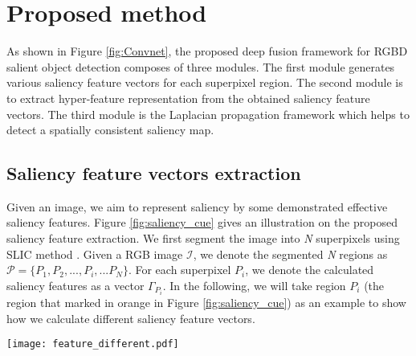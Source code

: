 \documentclass[journal]{IEEEtran}
\begin{document}
\section{Proposed method}
As shown in Figure \ref{fig:Convnet}, the proposed deep fusion framework for RGBD salient object detection composes of three modules. The first module generates various saliency feature vectors for each superpixel region. The second module is to extract hyper-feature representation from the obtained saliency feature vectors. The third module is the Laplacian propagation framework which helps to detect a spatially consistent saliency map.

\subsection{Saliency feature vectors extraction}\label{title_3_1}
Given an image, we aim to represent saliency by some demonstrated effective saliency features.
Figure \ref{fig:saliency_cue} gives an illustration on the proposed saliency feature extraction. We first segment the image into \emph{N} superpixels using SLIC method \cite{achanta2012slic}. Given a RGB image $\mathcal{I}$, we denote the segmented \emph{N} regions as $\mathcal{P}  = \{ {P_1},{P_2},...,{P_i},...{P_N}\} $. For each superpixel ${P_i}$, we denote the calculated saliency features as a vector ${\Gamma _{{P_i}}}$.
In the following, we will take region $P_i$ (the region that marked in orange in Figure \ref{fig:saliency_cue}) as an example to show how we calculate different saliency feature vectors.
\begin{figure*}[t]
\centering
\texttt{[image: feature\_different.pdf]}

   \caption{Saliency feature extraction.}
\label{fig:saliency_cue}
\vspace{-1.0mm}
\end{figure*}
\end{document}
